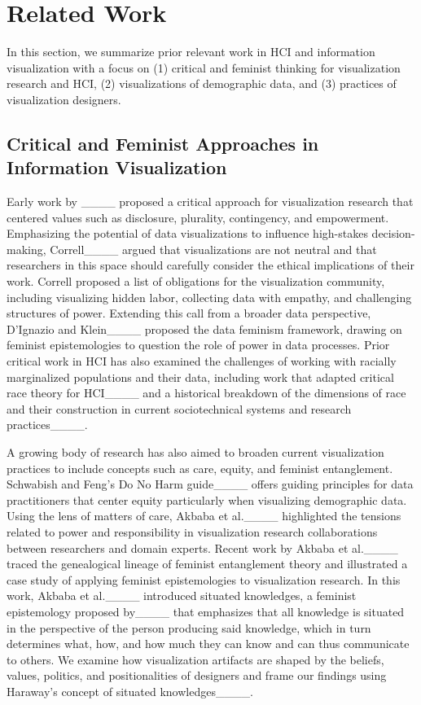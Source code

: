 \section{Related Work}
In this section, we summarize prior relevant work in HCI and information visualization with a focus on (1) critical and feminist thinking for visualization research and HCI, (2) visualizations of demographic data, and (3) practices of visualization designers. 

\subsection{Critical and Feminist Approaches in Information Visualization}
Early work by ____ proposed a critical approach for visualization research that centered values such as disclosure, plurality, contingency, and empowerment. Emphasizing the potential of data visualizations to influence high-stakes decision-making, Correll____ argued that visualizations are not neutral and that researchers in this space should carefully consider the ethical implications of their work. Correll proposed a list of obligations for the visualization community, including visualizing hidden labor, collecting data with empathy, and challenging structures of power. Extending this call from a broader data perspective, D'Ignazio and Klein____ proposed the data feminism framework, drawing on feminist epistemologies to question the role of power in data processes. Prior critical work in HCI has also examined the challenges of working with racially marginalized populations and their data, including work that adapted critical race theory for HCI____ and a historical breakdown of the dimensions of race and their construction in current sociotechnical systems and research practices____.

A growing body of research has also aimed to broaden current visualization practices to include concepts such as care, equity, and feminist entanglement. Schwabish and Feng's Do No Harm guide____ offers guiding principles for data practitioners that center equity particularly when visualizing demographic data. Using the lens of matters of care, Akbaba et al.____ highlighted the tensions related to power and responsibility in visualization research collaborations between researchers and domain experts. Recent work by Akbaba et al.____ traced the genealogical lineage of feminist entanglement theory and illustrated a case study of applying feminist epistemologies to visualization research. In this work, Akbaba et al.____ introduced situated knowledges, a feminist epistemology proposed by____ that emphasizes that all knowledge is situated in the perspective of the person producing said knowledge, which in turn determines what, how, and how much they can know and can thus communicate to others. We examine how visualization artifacts are shaped by the beliefs, values, politics, and positionalities of designers and frame our findings using Haraway's concept of situated knowledges____. 

